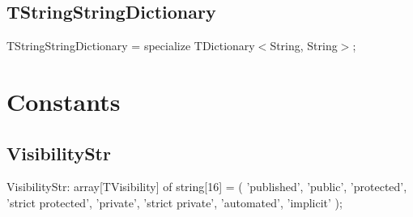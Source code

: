 \documentclass{report}
\newif\ifpdf
\begin{document}
\subsection*{TStringStringDictionary}
\fi
\label{PasDoc_Items-TStringStringDictionary}
\begin{list}{}{
\setlength{\itemindent}{0cm}
\setlength{\listparindent}{0cm}
\setlength{\leftmargin}{\evensidemargin}
\addtolength{\leftmargin}{\tmplength}
\settowidth{\labelsep}{X}
\addtolength{\leftmargin}{\labelsep}
\setlength{\labelwidth}{\tmplength}
}
\item[\textbf{Declaration}\hfill]
\ifpdf
\begin{flushleft}
\fi
\begin{ttfamily}
TStringStringDictionary = specialize TDictionary{$<$}String, String{$>$};\end{ttfamily}

\ifpdf
\end{flushleft}
\fi

\end{list}
\section{Constants}
\ifpdf
\subsection*{\large{\textbf{VisibilityStr}}\normalsize\hspace{1ex}\hrulefill}
\else
\subsection*{VisibilityStr}
\fi
\label{PasDoc_Items-VisibilityStr}
\begin{list}{}{
\setlength{\itemindent}{0cm}
\setlength{\listparindent}{0cm}
\setlength{\leftmargin}{\evensidemargin}
\addtolength{\leftmargin}{\tmplength}
\settowidth{\labelsep}{X}
\addtolength{\leftmargin}{\labelsep}
\setlength{\labelwidth}{\tmplength}
}
\item[\textbf{Declaration}\hfill]
\ifpdf
\begin{flushleft}
\fi
\begin{ttfamily}
VisibilityStr: array[TVisibility] of string[16] =
  (
   'published',
   'public',
   'protected',
   'strict protected',
   'private',
   'strict private',
   'automated',
   'implicit'
  );\end{ttfamily}

\ifpdf
\end{flushleft}
\fi

\end{list}
\ifpdf
\end{document}
